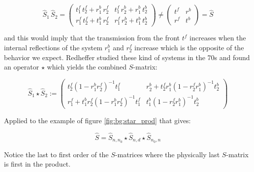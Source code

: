 \begin{equation}
    \hat S_1 \, \hat S_2 =
    \begin{pmatrix}
        t^f_1 \, t^f_2 + r^b_1 \, r^f_2 & t^f_1 \, r^b_2 + r^b_1 \, t^b_2 \\
        r^f_1 \, t^f_2 + t^b_1 \, r^f_2 & r^f_1 \, r^b_2 + t^b_1 \, t^b_2
    \end{pmatrix} \neq
    \begin{pmatrix}
        t^f & r^b \\
        r^f & t^b
    \end{pmatrix} =
    \hat S
\end{equation}

and this would imply that the transmission from the front $t^f$ increases when the internal reflections of the system $r^b_1$ and $r^f_2$ increase which is the opposite of the behavior we expect. Redheffer  studied these kind of systems in the 70s and found an operator $\star$ which yields the combined $S$-matrix:

\begin{equation}\label{eq:bg:star}
    \hat S_1 \star \hat S_2 :=
    \begin{pmatrix}
        t^f_2 (1 - r^b_1 r^f_2)^{-1} t^f_1 &
        r^b_2 + t^f_2 r^b_1 (1 - r^f_2 r^b_1)^{-1} t^b_2\\
        r^f_1 + t^b_1 r^f_2 (1 - r^b_1 r^f_2)^{-1} t^f_1 &
        t^b_1 (1 - r^f_2 r^b_1)^{-1} t^b_2
    \end{pmatrix}
\end{equation}

Applied to the example of figure \ref{fig:bg:star_prod} that gives:

\begin{equation}
    \hat S = \hat S_{n, n_0} \star \hat S_{n, d} \star \hat S_{n_0, n}
\end{equation}

Notice the last to first order of the $S$-matrices where the physically last $S$-matrix is first in the product.
